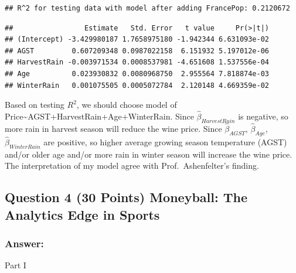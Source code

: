 \documentclass[
]{article}
\newenvironment{Shaded}{\begin{snugshade}}{\end{snugshade}}
\newcommand{\FunctionTok}[1]{\textcolor[rgb]{0.00,0.00,0.00}{#1}}
\newcommand{\NormalTok}[1]{#1}
\newcommand{\SpecialCharTok}[1]{\textcolor[rgb]{0.00,0.00,0.00}{#1}}
\begin{document}
\begin{verbatim}
## R^2 for testing data with model after adding FrancePop: 0.2120672
\end{verbatim}

\begin{Shaded}
\end{Shaded}

\begin{verbatim}
##                 Estimate   Std. Error   t value     Pr(>|t|)
## (Intercept) -3.429980187 1.7658975180 -1.942344 6.631093e-02
## AGST         0.607209348 0.0987022158  6.151932 5.197012e-06
## HarvestRain -0.003971534 0.0008537981 -4.651608 1.537556e-04
## Age          0.023930832 0.0080968750  2.955564 7.818874e-03
## WinterRain   0.001075505 0.0005072784  2.120148 4.669359e-02
\end{verbatim}

Based on testing \(R^2\), we should choose model of
Price\textasciitilde AGST+HarvestRain+Age+WinterRain. Since
\(\widehat{\beta}_{HarvestRain}\) is negative, so more rain in harvest
season will reduce the wine price. Since \(\widehat{\beta}_{AGST}\),
\(\widehat{\beta}_{Age}\), \(\widehat{\beta}_{WinterRain}\) are
positive, so higher average growing season temperature (AGST) and/or
older age and/or more rain in winter season will increase the wine
price. The interpretation of my model agree with Prof.~Ashenfelter's
finding.

\hypertarget{question-4-30-points-moneyball-the-analytics-edge-in-sports}{%
\subsection{Question 4 (30 Points) Moneyball: The Analytics Edge in
Sports}\label{question-4-30-points-moneyball-the-analytics-edge-in-sports}}

\hypertarget{answer-3}{%
\subsubsection{Answer:}\label{answer-3}}

Part I
\end{document}
